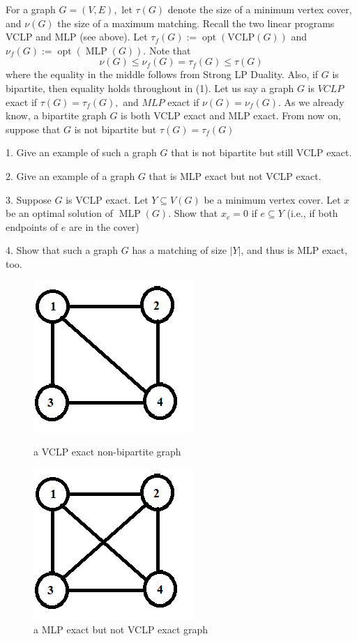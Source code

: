 \documentclass[11pt,a4paper,oneside]{article}
\begin{document}
\begin{problem}{4}
	\statement
    For a graph $G=(V, E),$ let $\tau(G)$ denote the size of a minimum vertex cover, and $\nu(G)$ the size of a maximum matching. Recall the two linear programs VCLP and MLP (see above). Let $\tau_{f}(G):=\operatorname{opt}(\mathrm{VCLP}(G))$ and $\nu_{f}(G):=\operatorname{opt}(\operatorname{MLP}(G)) .$ Note that
		\[
		\nu(G) \leq \nu_{f}(G)=\tau_{f}(G) \leq \tau(G)
		\]
		where the equality in the middle follows from Strong LP Duality. Also, if $G$ is bipartite, then equality holds throughout in (1). Let us say a graph $G$ is $V C L P$ exact if $\tau(G)=\tau_{f}(G),$ and $M L P$ exact if $\nu(G)=\nu_{f}(G) .$ As we already know, a bipartite graph $G$ is both VCLP exact and MLP exact. From now on, suppose that $G$ is not bipartite but $\tau(G)=\tau_{f}(G)$
		
		1. Give an example of such a graph $G$ that is not bipartite but still VCLP exact.
		
		2. Give an example of a graph $G$ that is MLP exact but not VCLP exact.
		
		3. Suppose $G$ is VCLP exact. Let $Y \subseteq V(G)$ be a minimum vertex cover. Let $x$ be an optimal solution of $\operatorname{MLP}(G) .$ Show that $x_{e}=0$ if $e \subseteq Y$ (i.e., if both endpoints of $e$ are in the cover)
		
		4. Show that such a graph $G$ has a matching of size $|Y|$, and thus is MLP exact, too.
    
    \solution
    
    \begin{figure}[htbp]
	\centering
	\begin{minipage}[t]{0.48\textwidth}
	\centering
	\includegraphics{figures/T4-1.png}
	\caption{a VCLP exact non-bipartite graph}
	\end{minipage}
	\begin{minipage}[t]{0.48\textwidth}
	\centering
	\includegraphics{figures/T4-2.png}
	\caption{a MLP exact but not VCLP exact graph}
	\end{minipage}
	\end{figure}


\end{problem}
\end{document}
